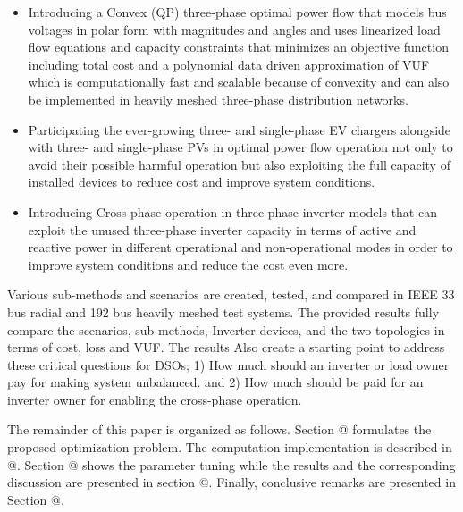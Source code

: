 \documentclass[journal]{IEEEtran}
\makeatletter
\newcommand*{\rom}[1]{\expandafter\@slowromancap\romannumeral #1@}
\makeatother
\begin{document}
\begin{itemize}
    \item  Introducing a Convex (QP) three-phase optimal power flow that models bus voltages in polar form with magnitudes and angles and uses linearized load flow equations and capacity constraints that minimizes an objective function including total cost and a polynomial data driven approximation of VUF which is computationally fast and scalable because of convexity and can also be implemented in heavily meshed three-phase distribution networks.
\end{itemize}
\begin{itemize}
    \item Participating the ever-growing three- and single-phase EV chargers alongside with three- and single-phase PVs in optimal power flow operation not only to avoid their possible harmful operation but also exploiting the full capacity of installed devices to reduce cost and improve system conditions. 
\end{itemize}
\begin{itemize}
    \item Introducing Cross-phase operation in three-phase inverter models that can exploit the unused three-phase inverter capacity in terms of active and reactive power in different operational and non-operational modes in order to improve system conditions and reduce the cost even more.
\end{itemize}

Various sub-methods and scenarios are created, tested, and compared in IEEE 33 bus radial and 192 bus heavily meshed test systems. The provided results fully compare the scenarios, sub-methods, Inverter devices, and the two topologies in terms of cost, loss and VUF. The results Also create a starting point to address these critical questions for DSOs; 1) How much should an inverter or load owner pay for making system unbalanced. and 2) How much should be paid for an inverter owner for enabling the cross-phase operation.  

The remainder of this paper is organized as follows. Section \rom{2} formulates the proposed optimization problem. The computation implementation is described in \rom {3}. Section \rom{4} shows the parameter tuning while the results and the corresponding discussion are presented in section \rom{5}. Finally, conclusive remarks are presented in Section \rom{6}.



\end{document}
